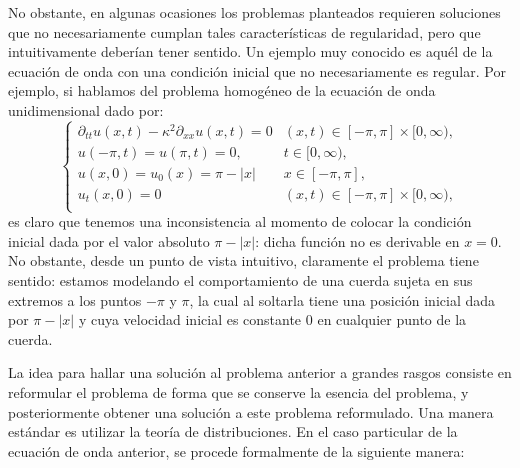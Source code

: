 \documentclass[letterpaper,twoside,12pt]{book}
\newcommand{\1}{\mathds{1}}
\newcommand{\abs}[1]{\left\lvert #1 \right\rvert}
\theoremstyle{definition}
\theoremstyle{definition}
\theoremstyle{remark}
\theoremstyle{definition}
\theoremstyle{definition}
\theoremstyle{definition}
\theoremstyle{definition}
\theoremstyle{definition}
\begin{document}
No obstante, en algunas ocasiones los problemas planteados requieren soluciones que no necesariamente cumplan tales características de regularidad, pero que intuitivamente deberían tener sentido.
 Un ejemplo muy conocido es aquél de la ecuación de onda con una condición inicial que no necesariamente es regular. Por ejemplo, si hablamos del problema homogéneo de la ecuación de onda unidimensional dado por:
\begin{equation}\label{wave_eq_sobolev}
    \begin{cases}
        \partial_{tt}u(x,t)-\kappa^2\partial_{xx}u(x,t)=0 & (x,t)\in [-\pi,\pi]\times[0,\infty),\\
        u(-\pi,t)=u(\pi,t)=0, & t\in [0,\infty),\\
        u(x,0)=u_0(x)=\pi-\abs{x} & x\in [-\pi,\pi],\\
        u_t(x,0)=0 & (x,t) \in [-\pi,\pi]\times[0,\infty),\\
    \end{cases}
\end{equation}
es claro que tenemos una inconsistencia al momento de colocar la condición inicial dada por el valor absoluto $\pi-|x|$: dicha función no es derivable en $x=0$. No obstante, desde un punto de vista intuitivo, claramente el problema tiene sentido: estamos modelando el comportamiento de una cuerda sujeta en sus extremos a los puntos $-\pi$ y $\pi$, la cual al soltarla tiene una posición inicial dada por $\pi-|x|$ y cuya velocidad inicial es constante $0$ en cualquier punto de la cuerda.\newline

La idea para hallar una solución al problema anterior a grandes rasgos consiste en reformular el problema de forma que se conserve la esencia del problema, y posteriormente obtener una solución a este problema reformulado. Una manera estándar es utilizar la teoría de distribuciones. En el caso particular de la ecuación de onda anterior, se procede formalmente de la siguiente manera:
\end{document}
